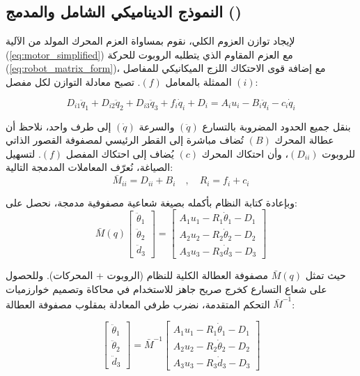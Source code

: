 \subsection{النموذج الديناميكي الشامل والمدمج ()}
لإيجاد توازن العزوم الكلي، نقوم بمساواة العزم المحرك المولد من الآلية (\ref{eq:motor_simplified}) مع العزم المقاوم الذي يتطلبه الروبوت للحركة (\ref{eq:robot_matrix_form})، مع إضافة قوى الاحتكاك اللزج الميكانيكي للمفاصل الممثلة بالمعامل $(f)$. تصبح معادلة التوازن لكل مفصل $(i)$:

\begin{equation}
D_{i1}\ddot{q}_1 + D_{i2}\ddot{q}_2 + D_{i3}\ddot{q}_3 + f_i \dot{q}_i + D_i = A_i u_i - B_i \ddot{q}_i - c_i \dot{q}_i
\end{equation}

بنقل جميع الحدود المضروبة بالتسارع $(\ddot{q})$ والسرعة $(\dot{q})$ إلى طرف واحد، نلاحظ أن عطالة المحرك $(B)$ تُضاف مباشرة إلى القطر الرئيسي لمصفوفة القصور الذاتي للروبوت $(D_{ii})$، وأن احتكاك المحرك $(c)$ يُضاف إلى احتكاك المفصل $(f)$. لتسهيل الصياغة، نُعرّف المعاملات المدمجة التالية:
\begin{equation}
\bar{M}_{ii} = D_{ii} + B_i \quad , \quad R_i = f_i + c_i
\end{equation}

وبإعادة كتابة النظام بأكمله بصيغة شعاعية مصفوفية مدمجة، نحصل على:
\begin{equation}
\bar{M}(q) \begin{bmatrix} \ddot{\theta}_1 \\ \ddot{\theta}_2 \\ \ddot{d}_3 \end{bmatrix} = 
\begin{bmatrix} A_1 u_1 - R_1 \dot{\theta}_1 - D_1 \\ A_2 u_2 - R_2 \dot{\theta}_2 - D_2 \\ A_3 u_3 - R_3 \dot{d}_3 - D_3 \end{bmatrix}
\end{equation}

حيث تمثل $\bar{M}(q)$ مصفوفة العطالة الكلية للنظام (الروبوت + المحركات). وللحصول على شعاع التسارع كخرج صريح جاهز للاستخدام في محاكاة  وتصميم خوارزميات التحكم المتقدمة، نضرب طرفي المعادلة بمقلوب مصفوفة العطالة $\bar{M}^{-1}$:

\begin{equation}
\begin{bmatrix} \ddot{\theta}_1 \\ \ddot{\theta}_2 \\ \ddot{d}_3 \end{bmatrix} = \bar{M}^{-1} 
\begin{bmatrix} A_1 u_1 - R_1 \dot{\theta}_1 - D_1 \\ A_2 u_2 - R_2 \dot{\theta}_2 - D_2 \\ A_3 u_3 - R_3 \dot{d}_3 - D_3 \end{bmatrix}
\label{eq:final_state_space}
\end{equation}

